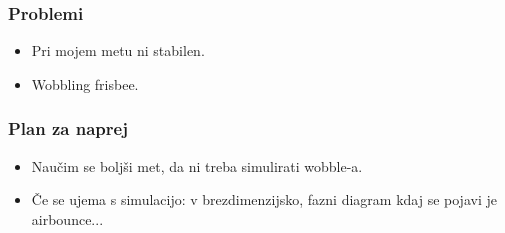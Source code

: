 \documentclass{beamer}
\begin{document}

\begin{frame}
\frametitle{Problemi}
\begin{itemize}
\item Pri mojem metu ni stabilen.
\item Wobbling frisbee.
\end{itemize}
\end{frame}

\begin{frame}
\frametitle{Plan za naprej}
\begin{itemize}
\item Naučim se boljši met, da ni treba simulirati wobble-a.
\item Če se ujema s simulacijo: v brezdimenzijsko, fazni diagram kdaj se pojavi je airbounce...
\end{itemize}
\end{frame}

\end{document}
